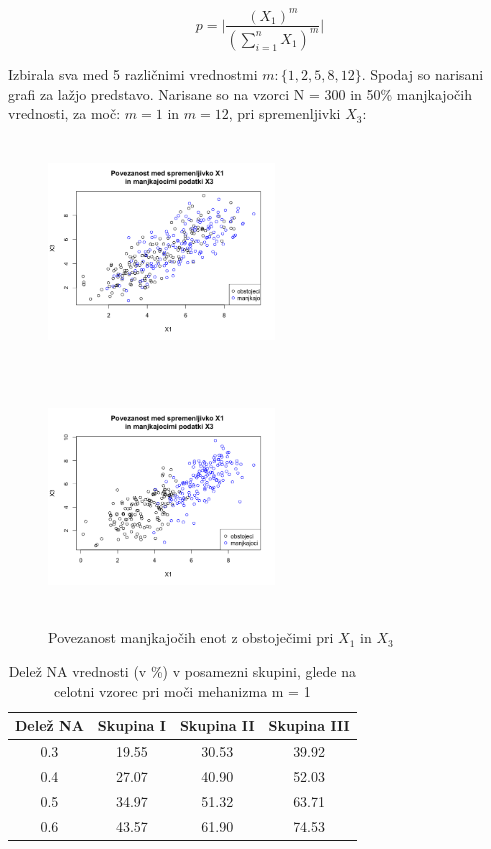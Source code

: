 \documentclass[12pt,a4paper]{article}
\begin{document}
$$p = \big| \frac{(X_1)^m}{(\sum_{i=1}^{n}X_1)^m} \big| $$

\noindent Izbirala sva med 5 različnimi vrednostmi $m: \{1, 2, 5, 8, 12  \}$. Spodaj so narisani grafi za lažjo predstavo. Narisane so na vzorci N = 300 in 50\% manjkajočih vrednosti, za moč: $m = 1$  in $m= 12$, pri spremenljivki $X_3$:

\begin{figure}[ht]
	\centering
	\begin{minipage}[b]{.5\linewidth}	
		\centering
		\includegraphics[width= 6cm, height = 6cm]{img/MAR_moc_1.png}
		\label{fig:1a}
	\end{minipage}%
	\begin{minipage}[b]{.5\linewidth}
		\centering
		\includegraphics[width= 6cm, height = 6cm]{img/MAR_moc_12.png}
		\label{fig:1b}
	\end{minipage}
	\caption{Povezanost manjkajočih enot z obstoječimi pri $X_1$ in $X_3$}
	\label{fig:1}
\end{figure}

\begin{table}[ht]
	\centering
	\begin{tabular}{cccc}
		Delež NA & Skupina I & Skupina II  &  Skupina III  \\
		\hline
     0.3 & 19.55 & 30.53 & 39.92\\
     0.4 & 27.07 & 40.90 & 52.03\\
     0.5 & 34.97 & 51.32 & 63.71\\
     0.6 & 43.57 & 61.90 & 74.53\\
	\end{tabular}
	\caption{Delež NA vrednosti (v \%) v posamezni skupini, glede na celotni vzorec pri moči mehanizma m = 1}
	\label{tab:1}
\end{table}
\end{document}
